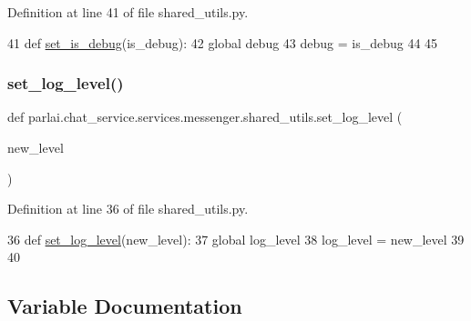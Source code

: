 Definition at line 41 of file shared\+\_\+utils.\+py.


\begin{DoxyCode}
41 \textcolor{keyword}{def }\hyperlink{namespaceparlai_1_1mturk_1_1core_1_1shared__utils_a8446a65c83fee3ccdfb7484ff5f3eedd}{set\_is\_debug}(is\_debug):
42     \textcolor{keyword}{global} debug
43     debug = is\_debug
44 
45 
\end{DoxyCode}
\mbox{\label{namespaceparlai_1_1chat__service_1_1services_1_1messenger_1_1shared__utils_a7dc5e90758e81aa2271a34f6730c7c79}} 
\subsubsection{\texorpdfstring{set\+\_\+log\+\_\+level()}{set\_log\_level()}}
{\footnotesize\ttfamily def parlai.\+chat\+\_\+service.\+services.\+messenger.\+shared\+\_\+utils.\+set\+\_\+log\+\_\+level (\begin{DoxyParamCaption}\item[{}]{new\+\_\+level }\end{DoxyParamCaption})}



Definition at line 36 of file shared\+\_\+utils.\+py.


\begin{DoxyCode}
36 \textcolor{keyword}{def }\hyperlink{namespaceparlai_1_1mturk_1_1core_1_1shared__utils_ac8a4f9a9107ed8eca14da5117922fbee}{set\_log\_level}(new\_level):
37     \textcolor{keyword}{global} log\_level
38     log\_level = new\_level
39 
40 
\end{DoxyCode}


\subsection{Variable Documentation}
\mbox{\label{namespaceparlai_1_1chat__service_1_1services_1_1messenger_1_1shared__utils_ac2178d68efd5a7cca079a851ff5ee252}} 
